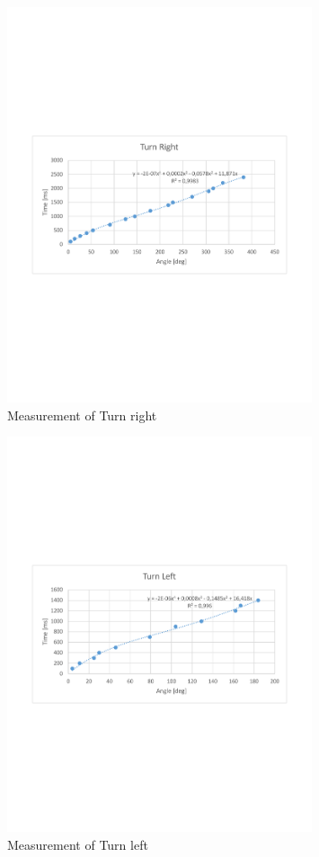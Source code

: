 \begin{figure}[H]
\centering
\includegraphics[width=0.8\textwidth]{billeder/TurnRightGraph.pdf}
\caption{Measurement of Turn right}\label{TurnRightGraph}
\end{figure} 
\begin{figure}[H]
\centering
\includegraphics[width=0.8\textwidth]{billeder/TurnLeftGraph.pdf}
\caption{Measurement of Turn left}\label{TurnLeftGraph}
\end{figure} 

